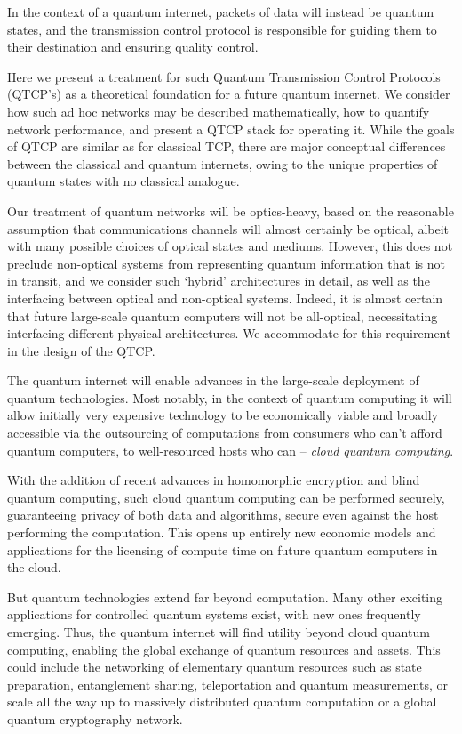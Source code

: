 \documentclass[aps,rmp,twocolumn,amsmath,amssymb,nofootinbib,superscriptaddress,longbibliography,floatfix]{revtex4-1}
\begin{document}
In the context of a quantum internet, packets of data will instead be quantum states, and the transmission control protocol is responsible for guiding them to their destination and ensuring quality control.

Here we present a treatment for such Quantum Transmission Control Protocols (QTCP's) as a theoretical foundation for a future quantum internet. We consider how such ad hoc networks may be described mathematically, how to quantify network performance, and present a QTCP stack for operating it. While the goals of QTCP are similar as for classical TCP, there are major conceptual differences between the classical and quantum internets, owing to the unique properties of quantum states with no classical analogue.

Our treatment of quantum networks will be optics-heavy, based on the reasonable assumption that communications channels will almost certainly be optical, albeit with many possible choices of optical states and mediums. However, this does not preclude non-optical systems from representing quantum information that is not in transit, and we consider such `hybrid' architectures in detail, as well as the interfacing between optical and non-optical systems. Indeed, it is almost certain that future large-scale quantum computers will not be all-optical, necessitating interfacing different physical architectures. We accommodate for this requirement in the design of the QTCP.

The quantum internet will enable advances in the large-scale deployment of quantum technologies. Most notably, in the context of quantum computing it will allow initially very expensive technology to be economically viable and broadly accessible via the outsourcing of computations from consumers who can't afford quantum computers, to well-resourced hosts who can -- \emph{cloud quantum computing}.

With the addition of recent advances in homomorphic encryption and blind quantum computing, such cloud quantum computing can be performed securely, guaranteeing privacy of both data and algorithms, secure even against the host performing the computation. This opens up entirely new economic models and applications for the licensing of compute time on future quantum computers in the cloud.

But quantum technologies extend far beyond computation. Many other exciting applications for controlled quantum systems exist, with new ones frequently emerging. Thus, the quantum internet will find utility beyond cloud quantum computing, enabling the global exchange of quantum resources and assets. This could include the networking of elementary quantum resources such as state preparation, entanglement sharing, teleportation and quantum measurements, or scale all the way up to massively distributed quantum computation or a global quantum cryptography network.
\end{document}
